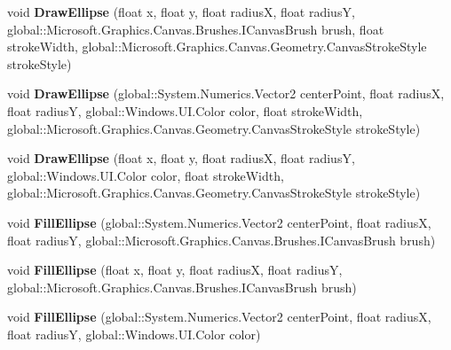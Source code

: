 \begin{DoxyCompactItemize}
void {\bfseries Draw\+Ellipse} (float x, float y, float radiusX, float radiusY, global\+::\+Microsoft.\+Graphics.\+Canvas.\+Brushes.\+I\+Canvas\+Brush brush, float stroke\+Width, global\+::\+Microsoft.\+Graphics.\+Canvas.\+Geometry.\+Canvas\+Stroke\+Style stroke\+Style)
\item 
\mbox{\label{class_microsoft_1_1_graphics_1_1_canvas_1_1_canvas_drawing_session_a2d442e65f89c2d0144de192be4cb8d9f}} 
void {\bfseries Draw\+Ellipse} (global\+::\+System.\+Numerics.\+Vector2 center\+Point, float radiusX, float radiusY, global\+::\+Windows.\+U\+I.\+Color color, float stroke\+Width, global\+::\+Microsoft.\+Graphics.\+Canvas.\+Geometry.\+Canvas\+Stroke\+Style stroke\+Style)
\item 
\mbox{\label{class_microsoft_1_1_graphics_1_1_canvas_1_1_canvas_drawing_session_a0187ff11ec04e18e8ddddf5fb34cce39}} 
void {\bfseries Draw\+Ellipse} (float x, float y, float radiusX, float radiusY, global\+::\+Windows.\+U\+I.\+Color color, float stroke\+Width, global\+::\+Microsoft.\+Graphics.\+Canvas.\+Geometry.\+Canvas\+Stroke\+Style stroke\+Style)
\item 
\mbox{\label{class_microsoft_1_1_graphics_1_1_canvas_1_1_canvas_drawing_session_a2850ffcea774b66b3dfb2100996910f6}} 
void {\bfseries Fill\+Ellipse} (global\+::\+System.\+Numerics.\+Vector2 center\+Point, float radiusX, float radiusY, global\+::\+Microsoft.\+Graphics.\+Canvas.\+Brushes.\+I\+Canvas\+Brush brush)
\item 
\mbox{\label{class_microsoft_1_1_graphics_1_1_canvas_1_1_canvas_drawing_session_a25a4a1e0f22a867afbb82d71686cfca9}} 
void {\bfseries Fill\+Ellipse} (float x, float y, float radiusX, float radiusY, global\+::\+Microsoft.\+Graphics.\+Canvas.\+Brushes.\+I\+Canvas\+Brush brush)
\item 
\mbox{\label{class_microsoft_1_1_graphics_1_1_canvas_1_1_canvas_drawing_session_aca954c8d9a09f13f907f8886692f1074}} 
void {\bfseries Fill\+Ellipse} (global\+::\+System.\+Numerics.\+Vector2 center\+Point, float radiusX, float radiusY, global\+::\+Windows.\+U\+I.\+Color color)

\end{DoxyCompactItemize}
